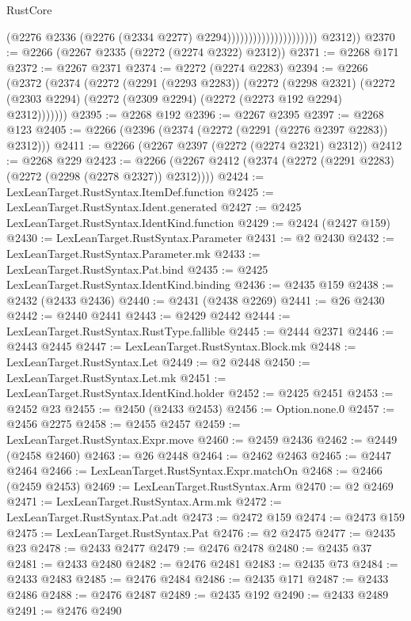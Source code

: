 \begin{lexlean}{RustCore}
\begin{coremodule}
                                              (@2276
                                                @2336
                                                (@2276 (@2334 @2277) @2294)))))))))))))))))))))
        @2312))
@2370 := @2266 (@2267 @2335 (@2272 (@2274 @2322) @2312))
@2371 := @2268 @171
@2372 := @2267 @2371
@2374 := @2272 (@2274 @2283)
@2394 := @2266
    (@2372
      (@2374
        (@2272
          (@2291 (@2293 @2283))
          (@2272
            (@2298 @2321)
            (@2272 (@2303 @2294) (@2272 (@2309 @2294) (@2272 (@2273 @192 @2294) @2312)))))))
@2395 := @2268 @192
@2396 := @2267 @2395
@2397 := @2268 @123
@2405 := @2266 (@2396 (@2374 (@2272 (@2291 (@2276 @2397 @2283)) @2312)))
@2411 := @2266 (@2267 @2397 (@2272 (@2274 @2321) @2312))
@2412 := @2268 @229
@2423 := @2266 (@2267 @2412 (@2374 (@2272 (@2291 @2283) (@2272 (@2298 (@2278 @2327)) @2312))))
@2424 := LexLeanTarget.RustSyntax.ItemDef.function
@2425 := LexLeanTarget.RustSyntax.Ident.generated
@2427 := @2425 LexLeanTarget.RustSyntax.IdentKind.function
@2429 := @2424 (@2427 @159)
@2430 := LexLeanTarget.RustSyntax.Parameter
@2431 := @2 @2430
@2432 := LexLeanTarget.RustSyntax.Parameter.mk
@2433 := LexLeanTarget.RustSyntax.Pat.bind
@2435 := @2425 LexLeanTarget.RustSyntax.IdentKind.binding
@2436 := @2435 @159
@2438 := @2432 (@2433 @2436)
@2440 := @2431 (@2438 @2269)
@2441 := @26 @2430
@2442 := @2440 @2441
@2443 := @2429 @2442
@2444 := LexLeanTarget.RustSyntax.RustType.fallible
@2445 := @2444 @2371
@2446 := @2443 @2445
@2447 := LexLeanTarget.RustSyntax.Block.mk
@2448 := LexLeanTarget.RustSyntax.Let
@2449 := @2 @2448
@2450 := LexLeanTarget.RustSyntax.Let.mk
@2451 := LexLeanTarget.RustSyntax.IdentKind.holder
@2452 := @2425 @2451
@2453 := @2452 @23
@2455 := @2450 (@2433 @2453)
@2456 := Option.none.{0}
@2457 := @2456 @2275
@2458 := @2455 @2457
@2459 := LexLeanTarget.RustSyntax.Expr.move
@2460 := @2459 @2436
@2462 := @2449 (@2458 @2460)
@2463 := @26 @2448
@2464 := @2462 @2463
@2465 := @2447 @2464
@2466 := LexLeanTarget.RustSyntax.Expr.matchOn
@2468 := @2466 (@2459 @2453)
@2469 := LexLeanTarget.RustSyntax.Arm
@2470 := @2 @2469
@2471 := LexLeanTarget.RustSyntax.Arm.mk
@2472 := LexLeanTarget.RustSyntax.Pat.adt
@2473 := @2472 @159
@2474 := @2473 @159
@2475 := LexLeanTarget.RustSyntax.Pat
@2476 := @2 @2475
@2477 := @2435 @23
@2478 := @2433 @2477
@2479 := @2476 @2478
@2480 := @2435 @37
@2481 := @2433 @2480
@2482 := @2476 @2481
@2483 := @2435 @73
@2484 := @2433 @2483
@2485 := @2476 @2484
@2486 := @2435 @171
@2487 := @2433 @2486
@2488 := @2476 @2487
@2489 := @2435 @192
@2490 := @2433 @2489
@2491 := @2476 @2490

\end{coremodule}
\end{lexlean}
